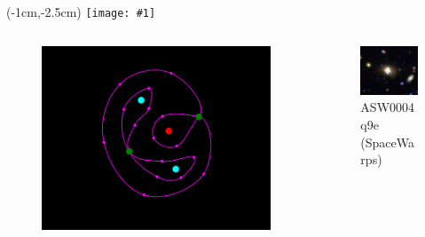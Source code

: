 \documentclass{beamer}
\newcommand{\imgframe}[1]{%
  \begin{frame}%
	\begin{textblock*}{0cm}(-1cm,-2.5cm)%
      \texttt{[image: \#1]}%
	\end{textblock*}%
  \end{frame}%
}
\begin{document}
\imgframe{imgs/fig1}

\begin{frame}
  \begin{columns}[T]
    \begin{column}{5.5cm}
      \begin{figure}
        \includegraphics[width=\textwidth]{imgs/sl-1}
      \end{figure}
    \end{column}
    \begin{column}{5.5cm}
      \begin{figure}
        \includegraphics[width=\textwidth]{imgs/real1}
        \caption{ASW0004q9e (SpaceWarps)}
      \end{figure}
    \end{column}
  \end{columns}
\end{frame}
\end{document}
